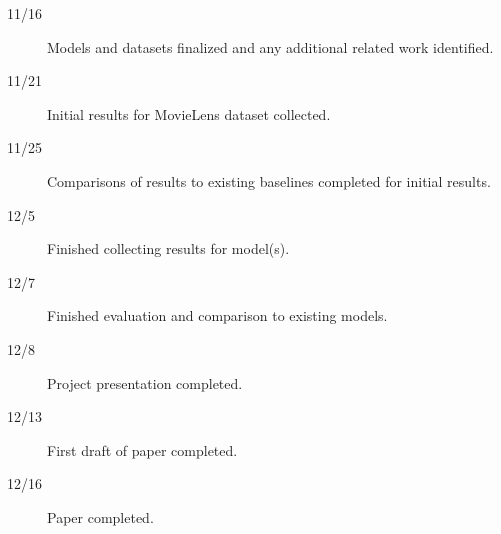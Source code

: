 \documentclass{article} %
\begin{document}
\begin{description}
	\item[11/16] Models and datasets finalized and any additional
			related work identified.
	\item[11/21] Initial results for MovieLens dataset collected.
	\item[11/25] Comparisons of results to existing baselines completed
			for initial results.
	\item[12/5] Finished collecting results for model(s).
	\item[12/7] Finished evaluation and comparison to existing models.
	\item[12/8] Project presentation completed.
	\item[12/13] First draft of paper completed.
	\item[12/16] Paper completed.
\end{description}


\end{document}
